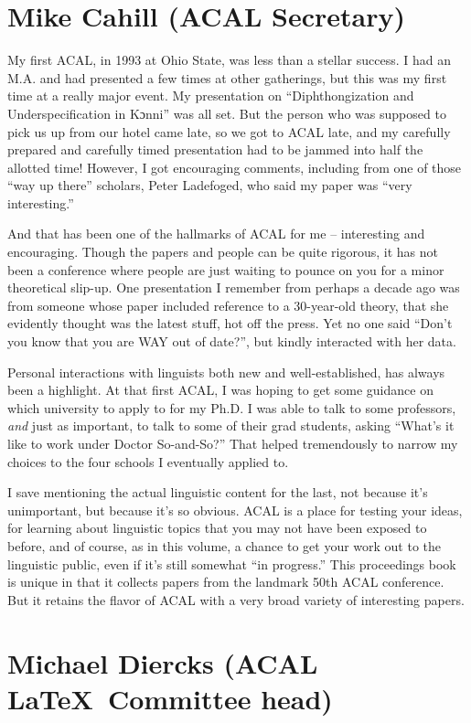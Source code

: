 \documentclass[output=paper]{langscibook}
\begin{document}
\section*{Mike Cahill (ACAL Secretary)}

My first ACAL, in 1993 at Ohio State, was less than a stellar success. I had an M.A. and had presented a few times at other gatherings, but this was my first time at a really major event. My presentation on “Diphthongization and Underspecification in Kɔnni” was all set. But the person who was supposed to pick us up from our hotel came late, so we got to ACAL late, and my carefully prepared and carefully timed presentation had to be jammed into half the allotted time! However, I got encouraging comments, including from one of those “way up there” scholars, Peter Ladefoged, who said my paper was “very interesting.” 

And that has been one of the hallmarks of ACAL for me -- interesting and encouraging. Though the papers and people can be quite rigorous, it has not been a conference where people are just waiting to pounce on you for a minor theoretical slip-up. One presentation I remember from perhaps a decade ago was from someone whose paper included reference to a 30-year-old theory, that she evidently thought was the latest stuff, hot off the press. Yet no one said “Don’t you know that you are WAY out of date?”, but kindly interacted with her data. 

Personal interactions with linguists both new and well-established, has always been a highlight. At that first ACAL, I was hoping to get some guidance on which university to apply to for my Ph.D. I was able to talk to some professors, \emph{and} just as important, to talk to some of their grad students, asking  “What’s it like to work under Doctor So-and-So?” That helped tremendously to narrow my choices to the four schools I eventually applied to. 

I save mentioning the actual linguistic content for the last, not because it’s unimportant, but because it’s so obvious. ACAL is a place for testing your ideas, for learning about linguistic topics that you may not have been exposed to before, and of course, as in this volume, a chance to get your work out to the linguistic public, even if it’s still somewhat “in progress.” This proceedings book is unique in that it collects papers from the landmark 50th ACAL conference. But it retains the flavor of ACAL with a very broad variety of interesting papers. 

\section*{Michael Diercks (ACAL \LaTeX\ Committee head)}
\end{document}
